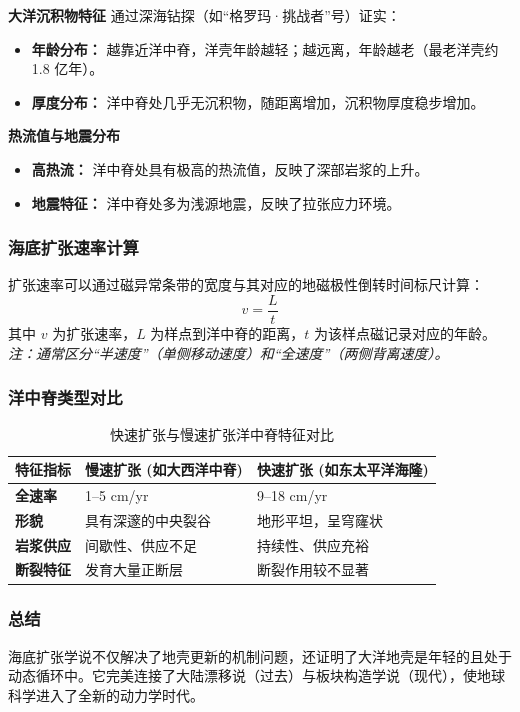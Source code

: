 \documentclass[12pt,a4paper]{article}
\begin{document}
	\textbf{大洋沉积物特征}
	通过深海钻探（如“格罗玛·挑战者”号）证实：
	\begin{itemize}
		\item \textbf{年龄分布：} 越靠近洋中脊，洋壳年龄越轻；越远离，年龄越老（最老洋壳约 1.8 亿年）。
		\item \textbf{厚度分布：} 洋中脊处几乎无沉积物，随距离增加，沉积物厚度稳步增加。
	\end{itemize}
	
	\textbf{热流值与地震分布}
	\begin{itemize}
		\item \textbf{高热流：} 洋中脊处具有极高的热流值，反映了深部岩浆的上升。
		\item \textbf{地震特征：} 洋中脊处多为浅源地震，反映了拉张应力环境。
	\end{itemize}
	
	\subsubsection{海底扩张速率计算}
	扩张速率可以通过磁异常条带的宽度与其对应的地磁极性倒转时间标尺计算：
	\[	v = \frac{L}{t} \]
	其中 $v$ 为扩张速率，$L$ 为样点到洋中脊的距离，$t$ 为该样点磁记录对应的年龄。
	\textit{注：通常区分“半速度”（单侧移动速度）和“全速度”（两侧背离速度）。}
	
	\subsubsection{洋中脊类型对比}
	
	\begin{table}[htbp]
		\centering
		\caption{快速扩张与慢速扩张洋中脊特征对比}
		\label{tab:ridge_compare}
		\begin{tabularx}{\textwidth}{l l l}
			\toprule
			特征指标 & 慢速扩张 (如大西洋中脊) & 快速扩张 (如东太平洋海隆) \\
			\midrule
			\textbf{全速率} & 1--5 cm/yr & 9--18 cm/yr \\
			\textbf{形貌} & 具有深邃的中央裂谷 & 地形平坦，呈穹窿状 \\
			\textbf{岩浆供应} & 间歇性、供应不足 & 持续性、供应充裕 \\
			\textbf{断裂特征} & 发育大量正断层 & 断裂作用较不显著 \\
			\bottomrule
		\end{tabularx}
	\end{table}
	
	\subsubsection{总结}
	海底扩张学说不仅解决了地壳更新的机制问题，还证明了大洋地壳是年轻的且处于动态循环中。它完美连接了大陆漂移说（过去）与板块构造学说（现代），使地球科学进入了全新的动力学时代。
	
\end{document}
